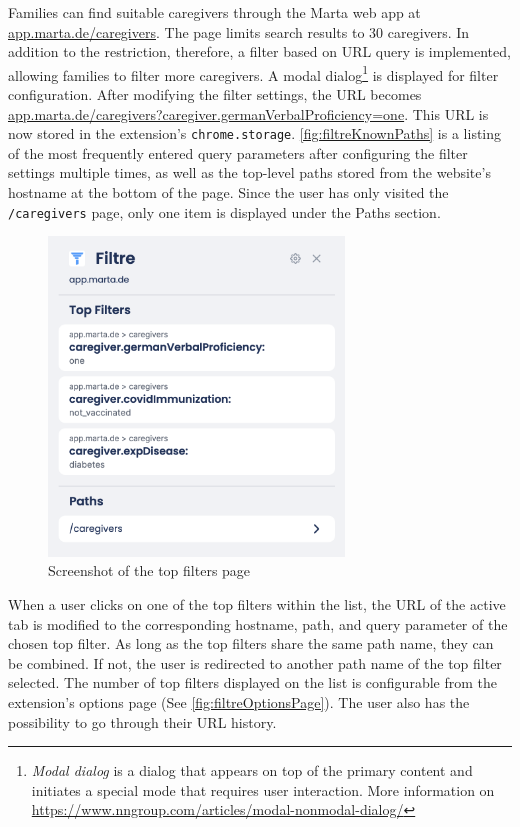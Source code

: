Families can find suitable caregivers through the Marta web app at \url{app.marta.de/caregivers}. The page limits search results to 30 caregivers. In addition to the restriction, therefore, a filter based on URL query is implemented, allowing families to filter more caregivers. A modal dialog\footnote{\emph{Modal dialog} is a dialog that appears on top of the primary content and initiates a special mode that requires user interaction. More information on \url{https://www.nngroup.com/articles/modal-nonmodal-dialog/}} is displayed for filter configuration. After modifying the filter settings, the URL becomes \url{app.marta.de/caregivers?caregiver.germanVerbalProficiency=one}. This URL is now stored in the extension's \texttt{chrome.storage}. \autoref{fig:filtreKnownPaths} is a listing of the most frequently entered query parameters after configuring the filter settings multiple times, as well as the top-level paths stored from the website's hostname at the bottom of the page. Since the user has only visited the \texttt{/caregivers} page, only one item is displayed under the Paths section.

\begin{figure}[H]
  \centering
  \includegraphics[width=0.7\textwidth]{assets/screenshot_filtre_top_filters.png}
  \caption{Screenshot of the top filters page}
  \label{fig:filtreKnownPaths}
\end{figure}

When a user clicks on one of the top filters within the list, the URL of the active tab is modified to the corresponding hostname, path, and query parameter of the chosen top filter. As long as the top filters share the same path name, they can be combined. If not, the user is redirected to another path name of the top filter selected. The number of top filters displayed on the list is configurable from the extension's options page (See \autoref{fig:filtreOptionsPage}). The user also has the possibility to go through their URL history.

